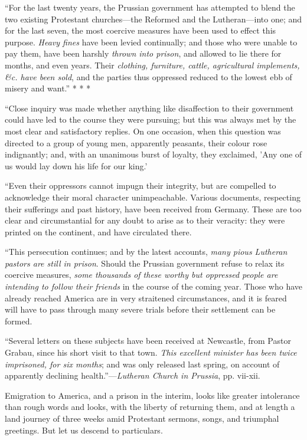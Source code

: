 ``For the last twenty years, the
Prussian government has attempted to blend the two existing Protestant
churches—the Reformed and the Lutheran—into one; and for the last
seven, the most coercive measures have been used to effect this purpose.
\emph{Heavy fines} have been levied continually; and those who were
unable to pay them, have been harshly \emph{thrown into prison}, and
allowed to lie there for months, and even years. Their \emph{clothing,
furniture, cattle, agricultural implements, \&c. have been sold},
and the parties thus oppressed reduced to the lowest ebb of misery and
want.'' *
* *

``Close inquiry was made whether
anything like disaffection to their government could have led to the
course they were pursuing; but this was always met by the most clear and
satisfactory replies. On one occasion, when this question was directed
to a group of young men, apparently peasants, their colour rose
indignantly; and, with an unanimous burst of loyalty, they exclaimed, 'Any
one of us would lay down his life for our king.'

``Even their oppressors cannot impugn
their integrity, but are compelled to acknowledge their moral character
unimpeachable. Various documents, respecting their sufferings and past
history, have been received from Germany. These are too clear and
circumstantial for any doubt to arise as to their veracity: they were
printed on the continent, and have circulated there.

``This persecution continues; and by
the latest accounts, \emph{many pious Lutheran pastors are still in prison}.
Should the Prussian government refuse to relax its coercive measures, \emph{some
thousands of these worthy but oppressed people are intending to follow
their friends} in the course of the coming year. Those who have
already reached America are in very straitened circumstances, and it is
feared will have to pass through many severe trials before their
settlement can be formed.

``Several letters on these subjects
have been received at Newcastle, from Pastor Grabau, since his short
visit to that town. \emph{This excellent minister has been twice
imprisoned, for six months}; and was only released last spring, on account of apparently declining health.''—\emph{Lutheran
Church in Prussia}, pp. vii-xii.

Emigration to America, and a prison in the interim,
looks like greater intolerance than rough words and looks, with the
liberty of returning them, and at length a land journey of three weeks
amid Protestant sermons, songs, and triumphal greetings. But let us
descend to particulars.


